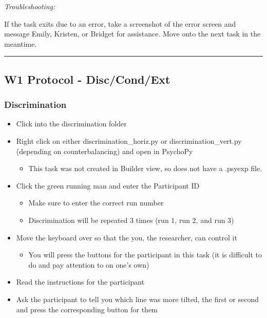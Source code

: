 \documentclass[]{book}
\providecommand{\tightlist}{%
  \setlength{\itemsep}{0pt}\setlength{\parskip}{0pt}}
\begin{document}
\emph{Troubleshooting:}

If the task exits due to an error, take a screenshot of the error screen and message Emily, Kristen, or Bridget for assistance. Move onto the next task in the meantime.

\begin{center}\rule{0.5\linewidth}{0.5pt}\end{center}

\hypertarget{w1-protocol---disccondext}{%
\subsection{W1 Protocol - Disc/Cond/Ext}\label{w1-protocol---disccondext}}

\hypertarget{discrimination}{%
\subsubsection{Discrimination}\label{discrimination}}

\begin{itemize}
\tightlist
\item
  Click into the discrimination folder
\item
  Right click on either discrimination\_horiz.py or discrimination\_vert.py (depending on counterbalancing) and open in PsychoPy

  \begin{itemize}
  \tightlist
  \item
    This task was not created in Builder view, so does not have a .psyexp file.
  \end{itemize}
\item
  Click the green running man and enter the Participant ID

  \begin{itemize}
  \tightlist
  \item
    Make sure to enter the correct run number
  \item
    Discrimination will be repeated 3 times (run 1, run 2, and run 3)
  \end{itemize}
\item
  Move the keyboard over so that the you, the researcher, can control it

  \begin{itemize}
  \tightlist
  \item
    You will press the buttons for the participant in this task (it is difficult to do and pay attention to on one's own)
  \end{itemize}
\item
  Read the instructions for the participant
\item
  Ask the participant to tell you which line was more tilted, the first or second and press the corresponding button for them
\end{itemize}
\end{document}
